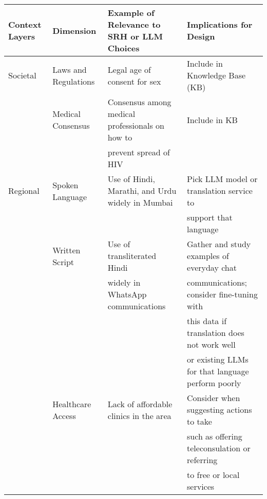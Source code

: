 \begin{table*}[h]
\centering
\small
\begin{tabular}{l l l l}
\toprule
\textbf{Context Layers} &\textbf{Dimension} & \textbf{Example of Relevance to SRH or LLM Choices} & \textbf{Implications for Design} \\
\toprule

Societal & Laws and Regulations & Legal age of consent for sex & Include in Knowledge Base (KB)\\
  & Medical Consensus & Consensus among medical professionals on how to  & Include in KB\\
  & &  prevent spread of HIV & \\ 
 \hline
Regional & Spoken Language & Use of Hindi, Marathi, and Urdu widely in Mumbai & Pick LLM model or translation service to \\
  & & & support that language \\ 
 & Written Script & Use of transliterated Hindi & Gather and study examples of everyday chat \\
& & widely in WhatsApp communications &  communications; consider fine-tuning with \\
& & &  this data if translation does not work well \\
& & & or existing LLMs for that language perform poorly \\
 & Healthcare Access & Lack of affordable clinics in the area & Consider when suggesting actions to take \\
& & & such as offering teleconsulation or referring \\
& & & to free or local services \\
  \hline
  

\end{tabular}
\end{table*}
